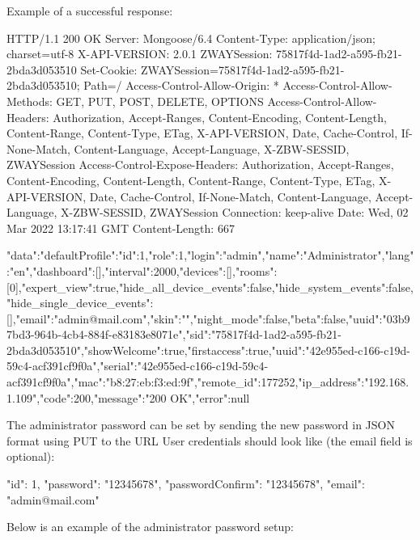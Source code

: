 Example of a successful response:
\begin{listingverbatim}
HTTP/1.1 200 OK
Server: Mongoose/6.4
Content-Type: application/json; charset=utf-8
X-API-VERSION: 2.0.1
ZWAYSession: 75817f4d-1ad2-a595-fb21-2bda3d053510
Set-Cookie: ZWAYSession=75817f4d-1ad2-a595-fb21-2bda3d053510; Path=/
Access-Control-Allow-Origin: *
Access-Control-Allow-Methods: GET, PUT, POST, DELETE, OPTIONS
Access-Control-Allow-Headers: Authorization, Accept-Ranges, Content-Encoding, Content-Length, Content-Range, Content-Type, ETag, X-API-VERSION, Date, Cache-Control, If-None-Match, Content-Language, Accept-Language, X-ZBW-SESSID, ZWAYSession
Access-Control-Expose-Headers: Authorization, Accept-Ranges, Content-Encoding, Content-Length, Content-Range, Content-Type, ETag, X-API-VERSION, Date, Cache-Control, If-None-Match, Content-Language, Accept-Language, X-ZBW-SESSID, ZWAYSession
Connection: keep-alive
Date: Wed, 02 Mar 2022 13:17:41 GMT
Content-Length: 667

{"data":{"defaultProfile":{"id":1,"role":1,"login":"admin","name":"Administrator","lang":"en","dashboard":[],"interval":2000,"devices":[],"rooms":[0],"expert_view":true,"hide_all_device_events":false,"hide_system_events":false,"hide_single_device_events":[],"email":"admin@mail.com","skin":"","night_mode":false,"beta":false,"uuid":"03b97bd3-964b-4cb4-884f-e83183e8071e","sid":"75817f4d-1ad2-a595-fb21-2bda3d053510","showWelcome":true},"firstaccess":true,"uuid":"42e955ed-c166-c19d-59c4-acf391cf9f0a","serial":"42e955ed-c166-c19d-59c4-acf391cf9f0a","mac":"b8:27:eb:f3:ed:9f","remote_id":177252,"ip_address":"192.168.1.109"},"code":200,"message":"200 OK","error":null}
\end{listingverbatim}

The administrator password can be set by sending the new password in JSON format using PUT to the URL 
User credentials should look like (the email field is optional):

\begin{listingverbatim}
{"id": 1, "password": "12345678", "passwordConfirm": "12345678", "email": "admin@mail.com"}
\end{listingverbatim}

Below is an example of the administrator password setup:
{\scriptsize
\begin{quote} 
\end{quote}
}

